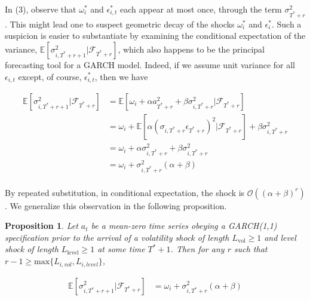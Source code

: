 \documentclass[11pt]{article}
\newtheorem{prop}{Proposition}
\theoremstyle{definition}
\begin{document}
In (3), observe that $\omega_{i}^{*}$ and $\epsilon^{*}_{i,t}$ each appear at most once, through the term $\sigma^{2}_{T^{*}+r}$.  This might lead one to suspect  geometric decay of the shocks $\omega_{i}^{*}$ and $\epsilon^{*}_{i}$.  Such a suspicion is easier to substantiate by examining the conditional expectation of the variance, $\mathbb{E}[ \sigma^{2}_{i,T^{*}+r+1} |\mathcal{F}_{T^{*}+r}]$, which also happens to be the principal forecasting tool for a GARCH model.  Indeed, if we assume unit variance for all $\epsilon_{i,t}$ except, of course, $\epsilon^{*}_{i,t}$, then we have 

\begin{align*}
\mathbb{E}[ \sigma^{2}_{i,T^{*}+r+1} |\mathcal{F}_{T^{*}+r}] & = \mathbb{E}[\omega_{i} + \alpha a_{T^{*}+r}^{2} + \beta\sigma^{2}_{i,T^{*}+r} |\mathcal{F}_{T^{*}+r}] \\
& = \omega_{i} + \mathbb{E}[\alpha(\sigma_{i,T^{*}+r}\epsilon_{T^{*}+r})^{2} |\mathcal{F}_{T^{*}+r}] + \beta\sigma^{2}_{i,T^{*}+r} \\
& = \omega_{i} + \alpha\sigma_{i,T^{*}+r}^{2} + \beta\sigma^{2}_{i,T^{*}+r} \tag{Due to the unit variance assumption}\\
& = \omega_{i} + \sigma^{2}_{i,T^{*}+r}(\alpha + \beta) \\
\end{align*}

By repeated substitution, in conditional expectation, the shock is $\mathcal{O}((\alpha+\beta)^{r})$.  We generalize this observation in the following proposition.

\begin{prop}
Let $a_{t}$ be a mean-zero time series obeying a GARCH(1,1) specification prior to the arrival of a volatility shock of length $L_{\text{vol}} \geq 1$ and level shock of length $L_{\text{level}}\geq 1$ at some time $T^{*}+1$.  Then for any $r$ such that $r-1 \geq \text{max}\{L_{i, vol},L_{i, level}\}$, 

\begin{align}
\mathbb{E}[ \sigma^{2}_{i,T^{*}+r+1} |\mathcal{F}_{T^{*}+r}] & = \omega_{i} + \sigma^{2}_{i,T^{*}+r}(\alpha + \beta) \\
\end{align}
\end{prop}
\end{document}
